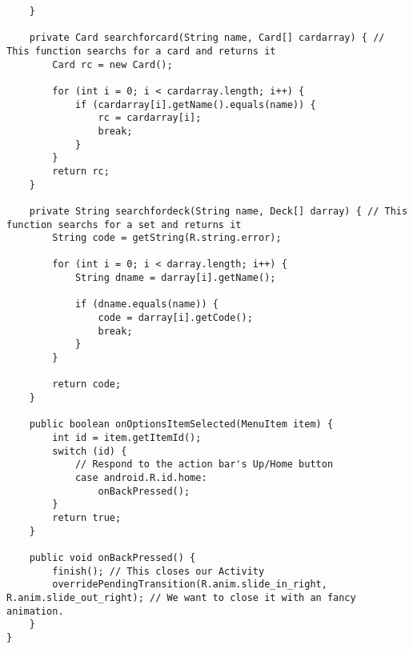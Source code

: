 \begin{lstlisting}
    }

    private Card searchforcard(String name, Card[] cardarray) { // This function searchs for a card and returns it
        Card rc = new Card();

        for (int i = 0; i < cardarray.length; i++) {
            if (cardarray[i].getName().equals(name)) {
                rc = cardarray[i];
                break;
            }
        }
        return rc;
    }

    private String searchfordeck(String name, Deck[] darray) { // This function searchs for a set and returns it
        String code = getString(R.string.error);

        for (int i = 0; i < darray.length; i++) {
            String dname = darray[i].getName();

            if (dname.equals(name)) {
                code = darray[i].getCode();
                break;
            }
        }

        return code;
    }

    public boolean onOptionsItemSelected(MenuItem item) {
        int id = item.getItemId();
        switch (id) {
            // Respond to the action bar's Up/Home button
            case android.R.id.home:
                onBackPressed();
        }
        return true;
    }

    public void onBackPressed() {
        finish(); // This closes our Activity
        overridePendingTransition(R.anim.slide_in_right, R.anim.slide_out_right); // We want to close it with an fancy animation.
    }
}

\end{lstlisting}
\newpage
